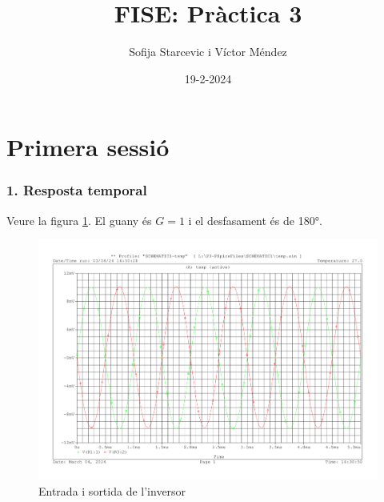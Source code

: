 \documentclass[catalan, a4paper, nobib]{tufte-handout}
\author{Sofija Starcevic i Víctor Méndez}
\title{FISE: Pràctica 3}
\date{19-2-2024}
\begin{document}
\maketitle

\part{Primera sessió}
\section{1. Resposta temporal}
 Veure la figura \ref{fig:q1}. El guany és $G=1$ i el desfasament és de \ang{180}.
\begin{figure}[h]
    \begin{center}
        \includegraphics[width=\linewidth]{q1.pdf}
    \end{center}
    \caption{Entrada i sortida de l'inversor}
    \label{fig:q1}
\end{figure}
\end{document}
